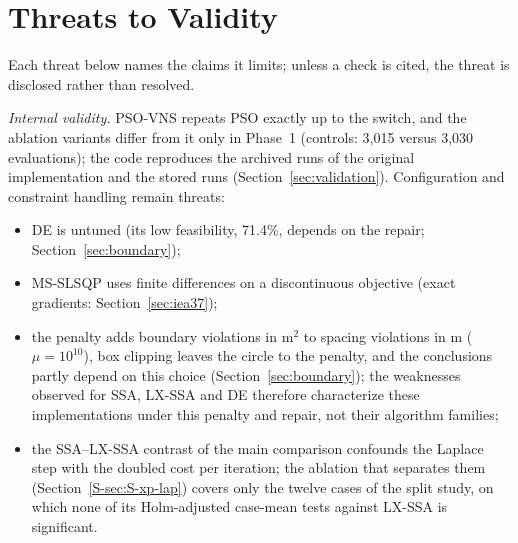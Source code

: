 
\section{Threats to Validity}
\label{sec:limits}
Each threat below names the claims it limits; unless a check is cited, the threat is disclosed rather than resolved.

\emph{Internal validity.} PSO-VNS repeats PSO exactly up to the switch, and the ablation variants differ from it only in Phase~1 (controls: 3,015 versus 3,030 evaluations); the code reproduces the archived runs of the original implementation and the stored runs (Section~\ref{sec:validation}). Configuration and constraint handling remain threats:
\begin{itemize}
\item DE is untuned (its low feasibility, 71.4\%, depends on the repair; Section~\ref{sec:boundary});
\item MS-SLSQP uses finite differences on a discontinuous objective (exact gradients: Section~\ref{sec:iea37});
\item the penalty adds boundary violations in m$^2$ to spacing violations in m ($\mu=10^{10}$), box clipping leaves the circle to the penalty, and the conclusions partly depend on this choice (Section~\ref{sec:boundary}); the weaknesses observed for SSA, LX-SSA and DE therefore characterize these implementations under this penalty and repair, not their algorithm families;
\item the SSA--LX-SSA contrast of the main comparison confounds the Laplace step with the doubled cost per iteration; the ablation that separates them (Section~\ref{S-sec:S-xp-lap}) covers only the twelve cases of the split study, on which none of its Holm-adjusted case-mean tests against LX-SSA is significant.
\end{itemize}

